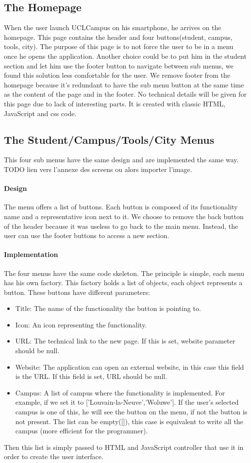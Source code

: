 \documentclass{eplmastersthesis}
\begin{document}
\subsection{The Homepage}
When the user launch UCLCampus on his smartphone, he arrives on the homepage. This page contains the header and four buttons(student, campus, tools, city). The purpose of this page is to not force the user to be in a menu once he opens the application. Another choice could be to put him in the student section and let him use the footer button to navigate between sub menus, we found this solution less comfortable for the user. We remove footer from the homepage because it's redundant to have the sub menu button at the same time as the content of the page and in the footer. No technical details will be given for this page due to lack of interesting parts. It is created with classic HTML, JavaScript and css code.
\subsection{The Student/Campus/Tools/City Menus}
This four sub menus have the same design and are implemented the same way.
TODO lien vers l'annexe des screens ou alors importer l'image. 
\paragraph{Design}
The menu offers a list of buttons. Each button is composed of its functionality name and a representative icon next to it. We choose to remove the back button of the header because it was useless to go back to the main menu. Instead, the user can use the footer buttons to access a new section. 
\paragraph{Implementation}
The four menus have the same code skeleton. The principle is simple, each menu has his own factory. This factory holds a list of objects, each object represents a button. These buttons have different parameters: 
\begin{itemize}
\item Title: The name of the functionality the button is pointing to.
\item Icon: An icon representing the functionality.
\item URL: The technical link to the new page. If this is set, website parameter should be null.
\item Website: The application can open an external website, in this case this field is the URL. If this field is set, URL should be null.
\item Campus: A list of campus where the functionality is implemented. For example, if we set it to ['Louvain-la-Neuve','Woluwe']. If the user's selected campus is one of this, he will see the button on the menu, if not the button is not present. The list can be empty([]), this case is equivalent to write all the campus (more efficient for the programmer). 
\end{itemize}
Then this list is simply passed to HTML and JavaScript controller that use it in order to create the user interface.
\end{document}
